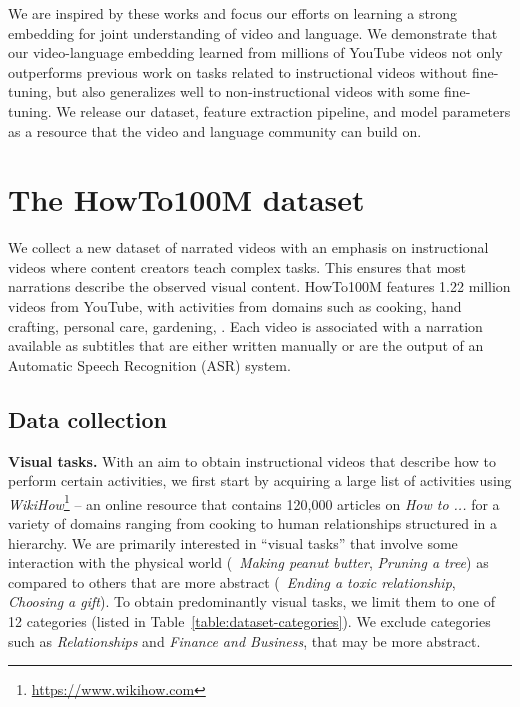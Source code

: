 \documentclass[10pt,twocolumn,letterpaper]{article}
\begin{document}
We are inspired by these works and focus our efforts on learning a strong embedding for joint understanding of video and language.
We demonstrate that our video-language embedding learned from millions of YouTube videos not only outperforms previous work on tasks related to instructional videos without fine-tuning, but also generalizes well to non-instructional videos with some fine-tuning.
We release our dataset, feature extraction pipeline, and model parameters as a resource that the video and language community can build on.








 
\section{The HowTo100M dataset}
\label{section:dataset}


We collect a new dataset of narrated videos with an emphasis on instructional videos where content creators teach complex tasks.
This ensures that most narrations describe the observed visual content.
HowTo100M features 1.22 million videos from YouTube, with activities from domains such as cooking, hand crafting, personal care, gardening, \etc.
Each video is associated with a narration available as subtitles that are either written manually or are the output of an Automatic Speech Recognition (ASR) system.



\subsection{Data collection}
\label{data_collection}

\noindent
\textbf{Visual tasks.}
With an aim to obtain instructional videos that describe how to perform certain activities, we first start by acquiring a large list of activities using \emph{WikiHow}\footnote{\url{https://www.wikihow.com}} -- an online resource that contains 120,000 articles on \textit{How to ...} for a variety of domains ranging from cooking to human relationships structured in a hierarchy.
We are primarily interested in ``visual tasks'' that involve some interaction with the physical world (\eg~\emph{Making peanut butter}, \emph{Pruning a tree}) as compared to others that are more abstract (\eg~\emph{Ending a toxic relationship}, \emph{Choosing a gift}).
To obtain predominantly visual tasks, we limit them to one of 12 categories (listed in Table~\ref{table:dataset-categories}).
We exclude categories such as \textit{Relationships} and \textit{Finance and Business}, that may be more abstract.
\end{document}

